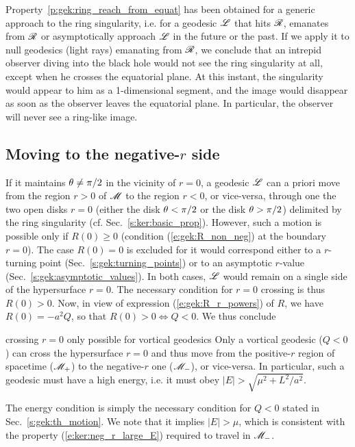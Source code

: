 Property~\ref{p:gek:ring_reach_from_equat}
has been obtained for a generic approach to the ring singularity,
i.e. for a geodesic $\mathscr{L}$ that hits $\mathscr{R}$, emanates from $\mathscr{R}$ or
asymptotically approach $\mathscr{L}$ in the future or the past. If we apply it to
null geodesics (light rays) emanating from $\mathscr{R}$, we conclude that an intrepid observer
diving into the black hole would not see the ring singularity at all, except when
he crosses the equatorial plane. At this instant, the singularity would appear
to him as a 1-dimensional segment, and the image would disappear as soon as the observer
leaves the equatorial plane. In particular, the observer will never see a ring-like image.


\subsection{Moving to the \texorpdfstring{negative-$r$}{negative-r} side}

If it maintains $\theta\neq \pi/2$ in the vicinity of $r=0$, a geodesic $\mathscr{L}$ can a priori
move from the region $r>0$ of $\mathscr{M}$ to the region $r<0$, or vice-versa, through one the
two open disks $r=0$ (either the disk $\theta < \pi/2$ or the disk $\theta>\pi/2$)
delimited by the ring singularity (cf. Sec.~\ref{s:ker:basic_prop}). However,
such a motion is possible only if $R(0) \geq 0$ (condition (\ref{e:gek:R_non_neg}) at the
boundary $r=0$).
The case $R(0) = 0$ is excluded for it would correspond either to a
$r$-turning point (Sec.~\ref{s:gek:turning_points}) or to an asymptotic $r$-value (Sec.~\ref{s:gek:asymptotic_values}). In both cases, $\mathscr{L}$ would remain on a single side of the hypersurface
$r=0$. The necessary condition for $r=0$ crossing is thus $R(0)> 0$. Now, in view of expression (\ref{e:gek:R_r_powers}) of $R$,
we have $R(0) = - a^2 Q$, so that $R(0)> 0 \iff Q < 0$. We thus conclude
\begin{tprop}{crossing $r=0$ only possible for vortical geodesics}{}
Only a vortical geodesic ($Q<0$) can cross the hypersurface $r=0$ and thus move from the positive-$r$ region of spacetime ($\mathscr{M}_+$) to the negative-$r$ one ($\mathscr{M}_-$), or vice-versa. In particular, such a geodesic must have
a high energy, i.e. it must obey $|E| > \sqrt{\mu^2 + L^2/a^2}$.
\end{tprop}
The energy condition is simply the necessary condition for $Q < 0$ stated
in Sec.~\ref{s:gek:th_motion}. We note that it implies $|E| > \mu$, which
is consistent with the property (\ref{e:ker:neg_r_large_E}) required to travel in $\mathscr{M}_-$.

